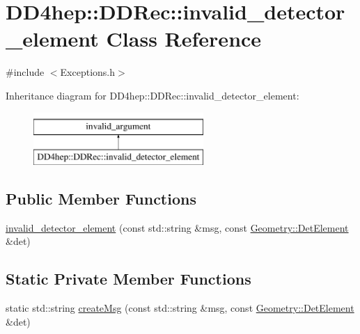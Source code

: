 \hypertarget{class_d_d4hep_1_1_d_d_rec_1_1invalid__detector__element}{}\section{D\+D4hep\+:\+:D\+D\+Rec\+:\+:invalid\+\_\+detector\+\_\+element Class Reference}
\label{class_d_d4hep_1_1_d_d_rec_1_1invalid__detector__element}


{\ttfamily \#include $<$Exceptions.\+h$>$}

Inheritance diagram for D\+D4hep\+:\+:D\+D\+Rec\+:\+:invalid\+\_\+detector\+\_\+element\+:\begin{figure}[H]
\begin{center}
\leavevmode
\includegraphics[height=2.000000cm]{class_d_d4hep_1_1_d_d_rec_1_1invalid__detector__element}
\end{center}
\end{figure}
\subsection*{Public Member Functions}
\begin{DoxyCompactItemize}
\item 
\hyperlink{class_d_d4hep_1_1_d_d_rec_1_1invalid__detector__element_af05d70f474fba21d10072fd98971f55e}{invalid\+\_\+detector\+\_\+element} (const std\+::string \&msg, const \hyperlink{class_d_d4hep_1_1_geometry_1_1_det_element}{Geometry\+::\+Det\+Element} \&det)
\end{DoxyCompactItemize}
\subsection*{Static Private Member Functions}
\begin{DoxyCompactItemize}
\item 
static std\+::string \hyperlink{class_d_d4hep_1_1_d_d_rec_1_1invalid__detector__element_a8e490d00933ab26fc58cac741958ac50}{create\+Msg} (const std\+::string \&msg, const \hyperlink{class_d_d4hep_1_1_geometry_1_1_det_element}{Geometry\+::\+Det\+Element} \&det)
\end{DoxyCompactItemize}


